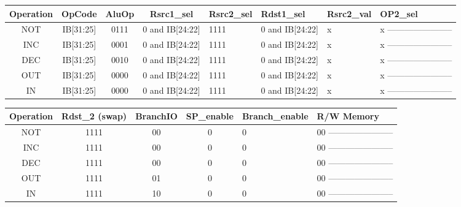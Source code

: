 \documentclass[12pt]{report}
\begin{document}
\begin{itemize}
        \begin{center}
        \begin{tabular}{||c| c| c| c| p{40mm}||} 
        \hline
        Operation & OpCode & AluOp & Rsrc1_sel & Rsrc2_sel & Rdst1_sel & Rsrc2_val & OP2_sel  \\ [0.5ex] 
        \hline\hline
        NOT & IB[31:25] & 0111 & 0 and IB[24:22] & 1111 & 0 and IB[24:22] & x & x ----------------------- \\
        \hline
        INC & IB[31:25] & 0001 & 0 and IB[24:22] & 1111 & 0 and IB[24:22] & x & x  ----------------------- \\
        \hline
        DEC & IB[31:25] & 0010 & 0 and IB[24:22] & 1111 & 0 and IB[24:22] & x & x ----------------------- \\
        \hline
        OUT & IB[31:25] & 0000 & 0 and IB[24:22] & 1111 & 0 and IB[24:22] & x & x ----------------------- \\
        \hline
        IN  & IB[31:25] & 0000 & 0 and IB[24:22] & 1111 & 0 and IB[24:22] & x & x ----------------------- \\
        \hline

        \end{tabular}
        \end{center}

        \begin{center}
        \begin{tabular}{||c| c| c| c| p{40mm}||} 
        \hline
        Operation & Rdst_2 (swap) & BranchIO & SP_enable & Branch_enable & R/W Memory  \\ [0.5ex] 
        \hline\hline
        NOT & 1111 & 00 & 0 & 0 & 00 ----------------------- \\
        \hline
        INC & 1111 & 00 & 0 & 0 & 00 ----------------------- \\
        \hline
        DEC & 1111 & 00 & 0 & 0 & 00 ----------------------- \\
        \hline
        OUT & 1111 & 01 & 0 & 0 & 00 ----------------------- \\
        \hline
        IN  & 1111 & 10 & 0 & 0 & 00 ----------------------- \\
        \hline

        \end{tabular}
        \end{center}



\end{itemize}
\end{document}
